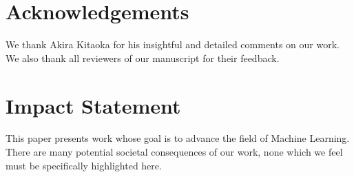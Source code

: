 \documentclass{article}
\theoremstyle{plain}
\theoremstyle{definition}
\theoremstyle{remark}
\begin{document}




















\section*{Acknowledgements}
We thank Akira Kitaoka for his insightful and detailed comments on our work.
We also thank all reviewers of our manuscript for their feedback.


\section*{Impact Statement}
This paper presents work whose goal is to advance the field of Machine
Learning. There are many potential societal consequences of our work, none
which we feel must be specifically highlighted here.
\end{document}
